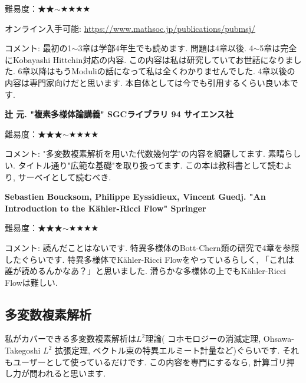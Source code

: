 難易度：★★$\sim$★★★★ \vspace{-6pt} 

オンライン入手可能: \url{https://www.mathsoc.jp/publications/pubmsj/}\vspace{-6pt}

コメント: 最初の1$\sim$3章は学部4年生でも読めます. 問題は4章以後.  4$\sim$5章は完全にKobayashi Hittchin対応の内容. この内容は私は研究していてお世話になりました. 6章以降はもうModuliの話になって私は全くわかりませんでした. 4章以後の内容は専門家向けだと思います. 本自体としては今でも引用するくらい良い本です. %
\vspace{8pt}

\textbf{辻 元. "複素多様体論講義" SGCライブラリ 94 サイエンス社}  \vspace{-6pt} 

難易度：★★★$\sim$★★★★ \vspace{-6pt} 

コメント: "多変数複素解析を用いた代数幾何学"の内容を網羅してます. 素晴らしい. タイトル通り"広範な基礎"を取り扱ってます. この本は教科書として読むより, サーベイとして読むべき. 
\vspace{8pt}

\textbf{Sebastien Boucksom, Philippe Eyssidieux, Vincent Guedj. "An Introduction to the Kähler-Ricci Flow" Springer}  \vspace{-6pt} 

難易度：★★★$\sim$★★★★ \vspace{-6pt} 

コメント: 読んだことはないです. 特異多様体のBott-Chern類の研究で4章を参照したぐらいです. 特異多様体でKähler-Ricci Flowをやっているらしく, 「これは誰が読めるんかなあ？」と思いました. 滑らかな多様体の上でもKähler-Ricci Flowは難しい. 

\subsection{多変数複素解析}

私がカバーできる多変数複素解析は$L^2$理論( コホモロジーの消滅定理, Ohsawa-Takegoshi $L^2$ 拡張定理, ベクトル束の特異エルミート計量など)ぐらいです. 
それもユーザーとして使っているだけです. 
この内容を専門にするなら, 計算ゴリ押し力が問われると思います. 

